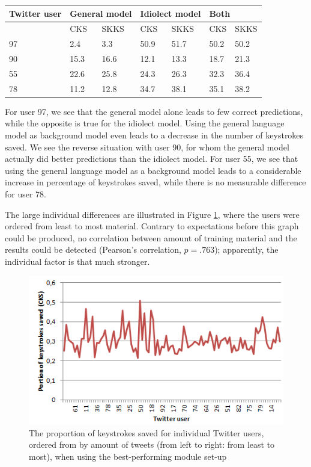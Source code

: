 \documentclass[11pt]{article}
\let\originaltable\table
\let\endoriginaltable\endtable
\renewenvironment{table}[1][ht]{%
  \originaltable[#1]
  \centering}%
  {\endoriginaltable}
\begin{document}
\begin{table}[H] 
\centering
\begin{tabular}{l|llllll} 
Twitter user&\multicolumn{2}{l}{General model}&\multicolumn{2}{l}{Idiolect model}&\multicolumn{2}{l}{Both}\\
\hline
&CKS&SKKS&CKS&SKKS&CKS&SKKS\\
97&2.4&3.3&50.9&51.7&50.2&50.2\\
90&15.3&16.6&12.1&13.3&18.7&21.3\\
55&22.6&25.8&24.3&26.3&32.3&36.4\\
78&11.2&12.8&34.7&38.1&35.1&38.2\\
\end{tabular} 
\caption{Percentage of keystrokes saved for 4 individual Twitter users, for the idiolect and the general model} \label{twitter_users}
\end{table}

For user 97, we see that the general model alone leads to few correct predictions, while the opposite is true for the idiolect model. Using the general language model as background model even leads to a decrease in the number of keystrokes saved. We see the reverse situation with user 90, for whom the general model actually did better predictions than the idiolect model. For user 55, we see that using the general language model as a background model leads to a considerable increase in percentage of keystrokes saved, while there is no measurable difference for user 78.

The large individual differences are illustrated in Figure \ref{chaos}, where the users were ordered from least to most material. Contrary to expectations before this graph could be produced, no correlation between amount of training material and the results could be detected (Pearson's correlation, $p = .763$); apparently, the individual factor is that much stronger.

\begin{figure}[H] \centering
\includegraphics[scale=1]{twitter_chaos}
\caption{The proportion of keystrokes saved for individual Twitter users, ordered from by amount of tweets (from left to right: from least to most), when using the best-performing module set-up}
\label{chaos}
\end{figure} 
\end{document}
